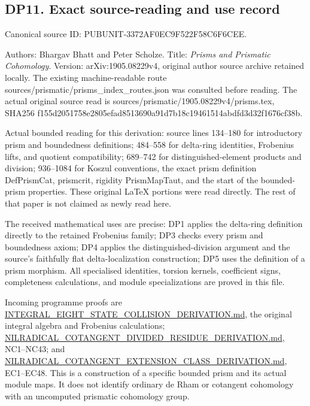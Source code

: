 \documentclass[
  10pt,
]{article}
\begin{document}
\subsection{DP11. Exact source-reading and use
record}\label{dp11.-exact-source-reading-and-use-record}

Canonical source ID: PUBUNIT-3372AF0EC9F522F58C6F6CEE.

Authors: Bhargav Bhatt and Peter Scholze. Title: \emph{Prisms and
Prismatic Cohomology}. Version: arXiv:1905.08229v4, original author
source archive retained locally. The existing machine-readable route
sources/prismatic/prisms\_index\_routes.json was consulted before
reading. The actual original source read is
sources/prismatic/1905.08229v4/prisms.tex, SHA256
f155d2051758e2805efad8513690a91d7b18c19461514abdfd3d32f1676cf38b.

Actual bounded reading for this derivation: source lines 134--180 for
introductory prism and boundedness definitions; 484--558 for delta-ring
identities, Frobenius lifts, and quotient compatibility; 689--742 for
distinguished-element products and division; 936--1084 for Koszul
conventions, the exact prism definition DefPrismCat, prismcrit, rigidity
PrismMapTaut, and the start of the bounded-prism properties. These
original LaTeX portions were read directly. The rest of that paper is
not claimed as newly read here.

The received mathematical uses are precise: DP1 applies the delta-ring
definition directly to the retained Frobenius family; DP3 checks every
prism and boundedness axiom; DP4 applies the distinguished-division
argument and the source's faithfully flat delta-localization
construction; DP5 uses the definition of a prism morphism. All
specialised identities, torsion kernels, coefficient signs, completeness
calculations, and module specializations are proved in this file.

Incoming programme proofs are
\url{INTEGRAL_EIGHT_STATE_COLLISION_DERIVATION.md}, the original
integral algebra and Frobenius calculations;
\url{NILRADICAL_COTANGENT_DIVIDED_RESIDUE_DERIVATION.md}, NC1--NC43; and
\url{NILRADICAL_COTANGENT_EXTENSION_CLASS_DERIVATION.md}, EC1--EC48.
This is a construction of a specific bounded prism and its actual module
maps. It does not identify ordinary de Rham or cotangent cohomology with
an uncomputed prismatic cohomology group.
\end{document}
